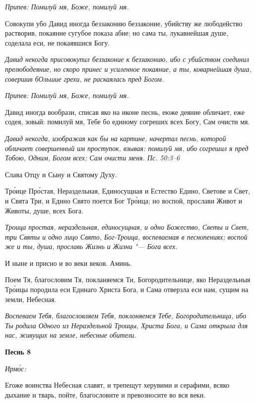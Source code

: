\itshape Припев:\normalfont{} Помилуй мя, Боже, помилуй мя.


Совокупи убо Давид иногда беззаконию беззаконие, убийству же любодейство растворив, покаяние сугубое показа абие; но сама ты, лукавнейшая душе, соделала еси, не покаявшися Богу.


\itshape Давид некогда присовокупил беззаконие к беззаконию, ибо с убийством соединил прелюбодеяние, но скоро принес и усиленное покаяние, а ты, коварнейшая душа, совершив бОльшие грехи, не раскаялась пред Богом.\normalfont{}


\itshape Припев:\normalfont{} Помилуй мя, Боже, помилуй мя.


Давид иногда вообрази, списав яко на иконе песнь, еюже деяние обличает, еже содея, зовый: помилуй мя, Тебе бо единому согреших всех Богу, Сам очисти мя.


\itshape Давид некогда, изображая как бы на картине, начертал песнь, которой обличает совершенный им проступок, взывая: помилуй мя, ибо согрешил я пред Тобою, Одним, Богом всех; Сам очисти меня. Пс. 50:3–6\normalfont{}


Слава Отцу и Сыну и Святому Духу.


Тро́ице Про́стая, Нераздельная, Единосущная и Естество Едино, Светове и Свет, и Свята Три, и Едино Свято поется Бог Тро́ица; но воспой, прослави Живот и Животы, душе, всех Бога.


\itshape Троица простая, нераздельная, единосущная, и одно Божество, Светы и Свет, три Святы и одно лицо Свято, Бог-Троица, воспеваемая в песнопениях; воспой же и ты, душа, прославь Жизнь и Жизни "--- Бога всех.\normalfont{}


И ныне и присно и во веки веков. Аминь.


Поем Тя, благословим Тя, покланяемся Ти, Богородительнице, яко Нераздельныя Тро́ицы породила еси Единаго Христа Бога, и Сама отверзла еси нам, сущим на земли, Небесная.


\itshape Воспеваем Тебя, благословляем Тебя, поклоняемся Тебе, Богородительница, ибо Ты родила Одного из Нераздельной Троицы, Христа Бога, и Сама открыла для нас, живущих на земле, небесные обители.\normalfont{}





\bfseries Песнь 8\normalfont{}


\itshape Ирмо́с:\normalfont{}


Егоже воинства Небесная славят, и трепещут херувими и серафими, всяко дыхание и тварь, пойте, благословите и превозносите во вся веки.


